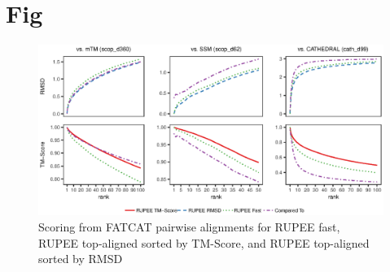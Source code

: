 \documentclass[letter]{article}
\begin{document}
\section{Fig}

\begin{figure}[!h]
\begin{center}
    \includegraphics[width=6in, keepaspectratio]{combined_scoring_fatcat}
\end{center}
\caption{Scoring from FATCAT pairwise alignments for RUPEE fast, RUPEE top-aligned sorted by TM-Score, and RUPEE top-aligned sorted by RMSD}
\label{fig:combined_scoring_fatcat}
\end{figure}
\end{document}
